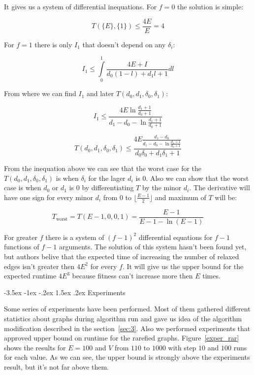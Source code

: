 \documentclass[a4paper,10pt]{article}
\makeatletter
\theoremstyle{definition}
\renewcommand\section{\@startsection {section}{1}{\z@}%
                                   {-3.5ex \@plus -1ex \@minus -.2ex}%
                                   {1.5ex \@plus.2ex}%
                                   {\large\bfseries}}
\makeatother
\begin{document}
It gives us a system of differential inequations. For $f = 0$ the solution is simple:

$$T(\{E\}, \{1\}) \le \frac{4E}{E} = 4$$

For $f = 1$ there is only $I_1$ that doesn't depend on any $\delta_i$:

$$I_1 \le \int\limits_0^1 \frac{4E + I}{d_0(1 - l) + d_1 l + 1} dl$$

From where we can find $I_1$ and later $T(d_0, d_1, \delta_0, \delta_1)$:

$$I_1 \le \frac{4E\ln\frac{d_1 + 1}{d_0 + 1}}{d_1 - d_0 - \ln\frac{d_1 + 1}{d_0 + 1}}$$

$$T(d_0, d_1, \delta_0, \delta_1) \le \frac{4E \frac{d_1 - d_0}{d_1 - d_0 - \ln\frac{d_1 + 1}{d_0 + 1}}}{d_0\delta_0 + d_1\delta_1 + 1}$$

From the inequation above we can see that the worst case for the $T(d_0, d_1, \delta_0, \delta_1)$ is when $\delta_i$ for the lager $d_i$ is $0$. Also we can show that the  worst case is when $d_0$ or $d_1$ is $0$ by differentiating $T$ by the minor $d_i$. The derivative will have one sign for every minor $d_i$ from $0$ to $\lfloor\frac{E - 1}{2}\rfloor$ and maximum of $T$ will be:

$$ T_\text{worst} = T(E - 1, 0, 0, 1) = \frac{E - 1}{E - 1 - \ln(E - 1)} $$

For greater $f$ there is a system of $(f - 1)^2$ differential equations for $f - 1$ functions of $f - 1$ arguments. The solution of this system hasn't been found yet, but authors belive that the expected time of increasing the number of relaxed edges isn't greater then $4E^2$ for every $f$. It will give us the upper bound for the expected runtime $4E^3$ because fitness can't increase more then $E$ times.

\section{Experiments}
\label{sec:5}

Some series of experiments have been performed. Most of them gathered different statistics about graphs during algorithm run and gave us idea of the algorithm modification described in the section~\ref{sec:3}. Also we performed experiments that approved upper bound on runtime for the rarefied graphs. Figure~\ref{exper_rar} shows the results for $E = 100$ and $V$ from $110$ to $1000$ with step $10$ and $100$ runs for each value. As we can see, the upper bound is strongly above the experiments result, but it's not far above them.
\end{document}
